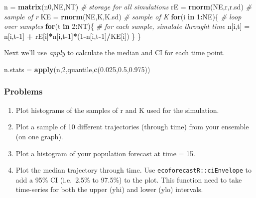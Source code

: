 \documentclass[]{article}
\newenvironment{Shaded}{\begin{snugshade}}{\end{snugshade}}
\newcommand{\KeywordTok}[1]{\textcolor[rgb]{0.13,0.29,0.53}{\textbf{#1}}}
\newcommand{\DecValTok}[1]{\textcolor[rgb]{0.00,0.00,0.81}{#1}}
\newcommand{\FloatTok}[1]{\textcolor[rgb]{0.00,0.00,0.81}{#1}}
\newcommand{\StringTok}[1]{\textcolor[rgb]{0.31,0.60,0.02}{#1}}
\newcommand{\CommentTok}[1]{\textcolor[rgb]{0.56,0.35,0.01}{\textit{#1}}}
\newcommand{\ControlFlowTok}[1]{\textcolor[rgb]{0.13,0.29,0.53}{\textbf{#1}}}
\newcommand{\OperatorTok}[1]{\textcolor[rgb]{0.81,0.36,0.00}{\textbf{#1}}}
\newcommand{\NormalTok}[1]{#1}
\begin{document}
\begin{Shaded}
\begin{Highlighting}[]
\NormalTok{n =}\StringTok{ }\KeywordTok{matrix}\NormalTok{(n0,NE,NT)   }\CommentTok{# storage for all simulations}
\NormalTok{rE =}\StringTok{ }\KeywordTok{rnorm}\NormalTok{(NE,r,r.sd)  }\CommentTok{# sample of r}
\NormalTok{KE =}\StringTok{ }\KeywordTok{rnorm}\NormalTok{(NE,K,K.sd)  }\CommentTok{# sample of K}
\ControlFlowTok{for}\NormalTok{(i }\ControlFlowTok{in} \DecValTok{1}\OperatorTok{:}\NormalTok{NE)\{        }\CommentTok{# loop over samples}
  \ControlFlowTok{for}\NormalTok{(t }\ControlFlowTok{in} \DecValTok{2}\OperatorTok{:}\NormalTok{NT)\{      }\CommentTok{# for each sample, simulate throught time}
\NormalTok{    n[i,t] =}\StringTok{ }\NormalTok{n[i,t}\OperatorTok{-}\DecValTok{1}\NormalTok{] }\OperatorTok{+}\StringTok{ }\NormalTok{rE[i]}\OperatorTok{*}\NormalTok{n[i,t}\OperatorTok{-}\DecValTok{1}\NormalTok{]}\OperatorTok{*}\NormalTok{(}\DecValTok{1}\OperatorTok{-}\NormalTok{n[i,t}\OperatorTok{-}\DecValTok{1}\NormalTok{]}\OperatorTok{/}\NormalTok{KE[i])}
\NormalTok{  \}}
\NormalTok{\}}
\end{Highlighting}
\end{Shaded}

Next we'll use \emph{apply} to calculate the median and CI for each time
point.

\begin{Shaded}
\begin{Highlighting}[]
\NormalTok{n.stats =}\StringTok{ }\KeywordTok{apply}\NormalTok{(n,}\DecValTok{2}\NormalTok{,quantile,}\KeywordTok{c}\NormalTok{(}\FloatTok{0.025}\NormalTok{,}\FloatTok{0.5}\NormalTok{,}\FloatTok{0.975}\NormalTok{))}
\end{Highlighting}
\end{Shaded}

\subsubsection{Problems}\label{problems-3}

\begin{enumerate}
\def\labelenumi{\arabic{enumi}.}
\setcounter{enumi}{3}
\item
  Plot histograms of the samples of r and K used for the simulation.
\item
  Plot a sample of 10 different trajectories (through time) from your
  ensemble (on one graph).
\item
  Plot a histogram of your population forecast at time = 15.
\item
  Plot the median trajectory through time. Use
  \texttt{ecoforecastR::ciEnvelope} to add a 95\% CI (i.e.~2.5\% to
  97.5\%) to the plot. This function need to take time-series for both
  the upper (yhi) and lower (ylo) intervals.
\end{enumerate}
\end{document}
